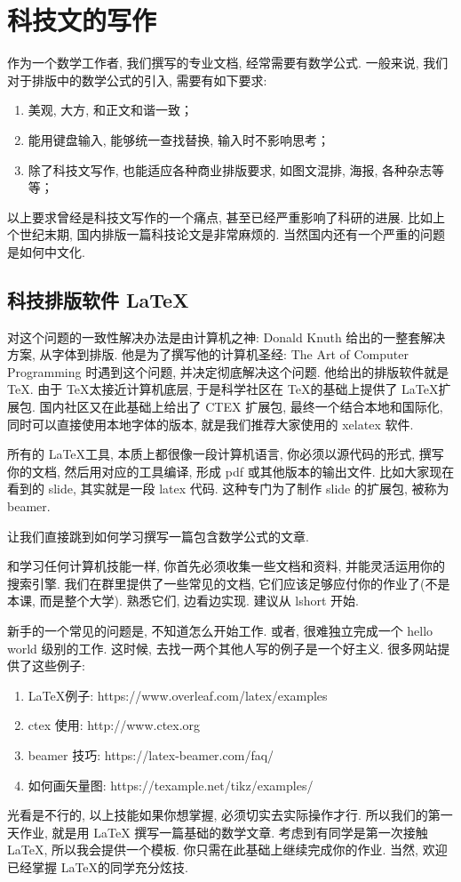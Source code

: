 \documentclass[a4paper]{ctexart}
\begin{document}
\section{科技文的写作}

作为一个数学工作者, 我们撰写的专业文档, 经常需要有数学公式. 一般来说, 我们对于排版中的数学公式的引入,
需要有如下要求:
\begin{enumerate}
\item 美观, 大方, 和正文和谐一致；
\item 能用键盘输入, 能够统一查找替换, 输入时不影响思考；
\item 除了科技文写作, 也能适应各种商业排版要求, 如图文混排, 海报, 各种杂志等等；
\end{enumerate}

以上要求曾经是科技文写作的一个痛点, 甚至已经严重影响了科研的进展. 比如上个世纪末期,
国内排版一篇科技论文是非常麻烦的. 当然国内还有一个严重的问题是如何中文化.

\subsection{科技排版软件 \LaTeX}
对这个问题的一致性解决办法是由计算机之神: Donald Knuth 给出的一整套解决方案, 从字体到排版.
他是为了撰写他的计算机圣经: The Art of Computer Programming 时遇到这个问题,
并决定彻底解决这个问题. 他给出的排版软件就是 \TeX. 由于 \TeX 太接近计算机底层,
于是科学社区在 \TeX 的基础上提供了 \LaTeX 扩展包. 国内社区又在此基础上给出了 CTEX 扩展包,
最终一个结合本地和国际化, 同时可以直接使用本地字体的版本, 就是我们推荐大家使用的 xelatex 软件.

所有的 \LaTeX 工具, 本质上都很像一段计算机语言, 你必须以源代码的形式, 撰写你的文档,
然后用对应的工具编译, 形成 pdf 或其他版本的输出文件. 比如大家现在看到的 slide,
其实就是一段 latex 代码. 这种专门为了制作 slide 的扩展包, 被称为 beamer.

让我们直接跳到如何学习撰写一篇包含数学公式的文章. 

和学习任何计算机技能一样, 你首先必须收集一些文档和资料, 并能灵活运用你的搜索引擎.
我们在群里提供了一些常见的文档, 它们应该足够应付你的作业了(不是本课, 而是整个大学).
熟悉它们, 边看边实现. 建议从 lshort 开始.

新手的一个常见的问题是, 不知道怎么开始工作. 或者, 很难独立完成一个 hello world 级别的工作.
这时候, 去找一两个其他人写的例子是一个好主义. 很多网站提供了这些例子:

\begin{enumerate}
\item \LaTeX 例子: https://www.overleaf.com/latex/examples
\item ctex 使用: http://www.ctex.org  
\item beamer 技巧: https://latex-beamer.com/faq/
\item 如何画矢量图: https://texample.net/tikz/examples/
\end{enumerate}

光看是不行的, 以上技能如果你想掌握, 必须切实去实际操作才行. 所以我们的第一天作业, 就是用 \LaTeX
撰写一篇基础的数学文章. 考虑到有同学是第一次接触 \LaTeX, 所以我会提供一个模板.
你只需在此基础上继续完成你的作业. 当然, 欢迎已经掌握 \LaTeX 的同学充分炫技. 



\end{document}
